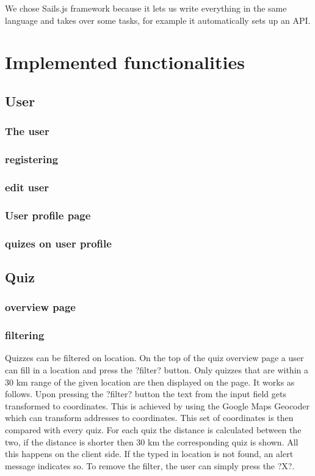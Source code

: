 \documentclass[11pt, oneside]{article}   	%
\begin{document}
We chose Sails.js framework because it lets us write everything in the same language and takes over some tasks, for example it automatically sets up an API.


\section{Implemented functionalities}
\subsection{User}

\subsubsection{The user}

\subsubsection{registering}

\subsubsection{edit user}

\subsubsection{User profile page}

\subsubsection{quizes on user profile}


\subsection{Quiz}
\subsubsection{ overview page}
\subsubsection{filtering}
Quizzes can be filtered on location. On the top of the quiz overview page a user can fill in a location and press the ?filter? button. Only quizzes that are within a 30 km range of the given location are then displayed on the page.
It works as follows. Upon pressing the ?filter? button the text from the input field gets transformed to coordinates. This is achieved by using the Google Maps Geocoder which can transform addresses to coordinates. This set of coordinates is then compared with every quiz. For each quiz the distance is calculated between the two, if the distance is shorter then 30 km the corresponding quiz is shown. All this happens on the client side.
If the typed in location is not found, an alert message indicates so. To remove the filter, the user can simply press the ?X?.
\end{document}
